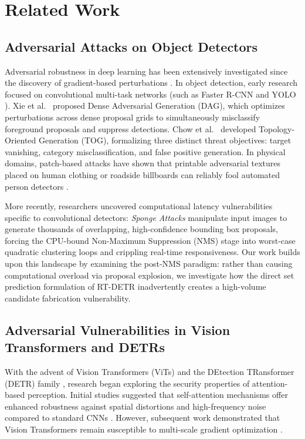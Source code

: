 \documentclass[preprint,12pt]{elsarticle}
\begin{document}
\section{Related Work}
\label{sec:related_work}

\subsection{Adversarial Attacks on Object Detectors}
Adversarial robustness in deep learning has been extensively investigated since the discovery of gradient-based perturbations \citep{szegedy2013intriguing, goodfellow2014explaining, madry2018towards}. In object detection, early research focused on convolutional multi-task networks (such as Faster R-CNN \citep{ren2015faster} and YOLO \citep{redmon2016you}). Xie et al.\ \citep{xie2017adversarial} proposed Dense Adversarial Generation (DAG), which optimizes perturbations across dense proposal grids to simultaneously misclassify foreground proposals and suppress detections. Chow et al.\ \citep{chow2020adversarial} developed Topology-Oriented Generation (TOG), formalizing three distinct threat objectives: target vanishing, category misclassification, and false positive generation. In physical domains, patch-based attacks have shown that printable adversarial textures placed on human clothing or roadside billboards can reliably fool automated person detectors \citep{thys2019fooling, lee2019physical, liu2018dpatch}.

More recently, researchers uncovered computational latency vulnerabilities specific to convolutional detectors: \textit{Sponge Attacks} \citep{chen2024overload, shapira2023phantom} manipulate input images to generate thousands of overlapping, high-confidence bounding box proposals, forcing the CPU-bound Non-Maximum Suppression (NMS) stage into worst-case quadratic clustering loops and crippling real-time responsiveness. Our work builds upon this landscape by examining the post-NMS paradigm: rather than causing computational overload via proposal explosion, we investigate how the direct set prediction formulation of RT-DETR inadvertently creates a high-volume candidate fabrication vulnerability.

\subsection{Adversarial Vulnerabilities in Vision Transformers and DETRs}
With the advent of Vision Transformers (ViTs) and the DEtection TRansformer (DETR) family \citep{carion2020end, zhu2020deformable, zhang2022dino}, research began exploring the security properties of attention-based perception. Initial studies suggested that self-attention mechanisms offer enhanced robustness against spatial distortions and high-frequency noise compared to standard CNNs \citep{naseer2021intriguing, gu2022adversarial}. However, subsequent work demonstrated that Vision Transformers remain susceptible to multi-scale gradient optimization \citep{shao2022adversarial, zheng2023towards}.
\end{document}

